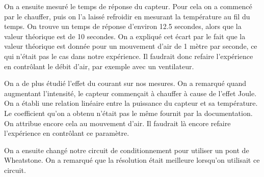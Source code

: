 \documentclass[12pt]{article}
\begin{document}
On a ensuite mesuré le temps de réponse du capteur. Pour cela on a commencé par le chauffer, puis on l'a laissé refroidir en mesurant la température au fil du temps. On trouve un temps de réponse d'environ 12.5 secondes, alors que la valeur théorique est de 10 secondes. On a expliqué cet écart par le fait que la valeur théorique est donnée pour un mouvement d'air de 1 mètre par seconde, ce qui n'était pas le cas dans notre expérience. Il faudrait donc refaire l'expérience en contrôlant le débit d'air, par exemple avec un ventilateur.

On a de plus étudié l'effet du courant sur nos mesures. On a remarqué quand augmentant l'intensité, le capteur commençait à chauffer à cause de l'effet Joule. On a établi une relation linéaire entre la puissance du capteur et sa température. Le coefficient qu'on a obtenu n'était pas le même fournit par la documentation. On attribue encore cela au mouvement d'air. Il faudrait là encore refaire l'expérience en contrôlant ce paramètre. 

On a ensuite changé notre circuit de conditionnement pour utiliser un pont de Wheatstone. On a remarqué que la résolution était meilleure lorsqu'on utilisait ce circuit.  



\newpage
\end{document}
